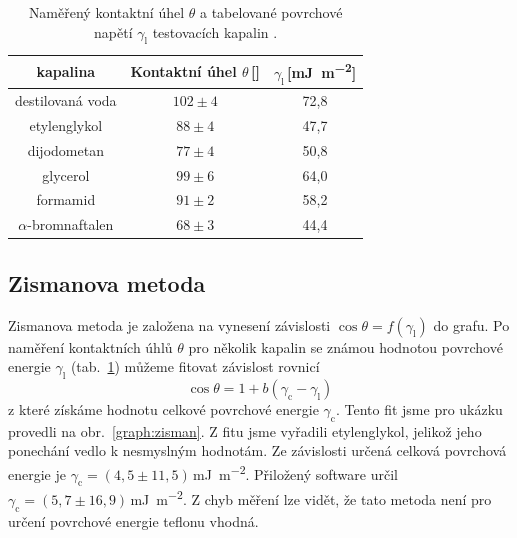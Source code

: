\documentclass{protokol}
\begin{document}
\begin{table}[h]
	\caption{Naměřený kontaktní úhel $\theta$ a tabelované povrchové napětí 
	$\gamma_{\text{l}}$ testovacích kapalin \cite{napetiKapalin}.}
	\label{table:surfTensionLiquid}
	\begin{tabular}{|c|c|c|}\hline
		kapalina  & Kontaktní úhel $\theta$\,[\si{\deg}] &
		$\gamma_{\text{l}}$\,[\si{\milli\joule\per\meter\squared}]\\ \hline
		destilovaná voda & $102\pm4$ & 72,8                              \\
		etylenglykol     & $88\pm4$ & 47,7                              \\
		dijodometan      & $77\pm4$ & 50,8                              \\
		glycerol         & $99\pm6$ & 64,0                              \\
		formamid         & $91\pm2$ & 58,2                              \\
		$\alpha$-bromnaftalen &$68\pm3$ & 44,4  \\ \hline
	\end{tabular}
\end{table}





\subsection{Zismanova metoda}
\par Zismanova metoda je založena na vynesení závislosti $\cos\theta = 
f\left(\gamma_{\text{l}} \right)$ do grafu. Po naměření kontaktních úhlů 
$\theta$ pro několik kapalin se známou hodnotou povrchové energie 
$\gamma_{\text{l}}$ (tab.~\ref{table:surfTensionLiquid}) můžeme fitovat 
závislost rovnicí
\begin{equation}
	\cos\theta = 1 + 
	b \left( \gamma_{\text{c}} - \gamma_{\text{l}} \right)
\end{equation}
z které získáme hodnotu celkové povrchové energie $\gamma_{\text{c}}$. Tento 
fit jsme pro ukázku provedli na obr.~\ref{graph:zisman}. Z fitu jsme vyřadili 
etylenglykol, jelikož jeho ponechání vedlo k nesmyslným hodnotám. Ze závislosti 
určená celková povrchová energie je $\gamma_{\text{c}} = 
(4,5\pm11,5)$\,\si{\milli\joule\per\meter\squared}. Přiložený software určil 
$\gamma_{\text{c}} = 
(5,7\pm16,9)$\,\si{\milli\joule\per\meter\squared}. Z chyb měření lze vidět, že 
tato 
metoda není pro určení povrchové energie teflonu vhodná.
\end{document}
